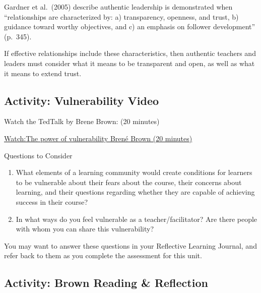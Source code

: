 \documentclass[
]{book}
\providecommand{\tightlist}{%
  \setlength{\itemsep}{0pt}\setlength{\parskip}{0pt}}
\begin{document}
Gardner et al.~(2005) describe authentic leadership is demonstrated when ``relationships are characterized by: a) transparency, openness, and trust, b) guidance toward worthy objectives, and c) an emphasis on follower development'' (p.~345).

If effective relationships include these characteristics, then authentic teachers and leaders must consider what it means to be transparent and open, as well as what it means to extend trust.

\hypertarget{activity-vulnerability-video}{%
\subsection*{Activity: Vulnerability Video}\label{activity-vulnerability-video}}

\begin{reflect}
Watch the TedTalk by Brene Brown: (20 minutes)

\href{https://www.youtube.com/watch?v=iCvmsMzlF7o}{Watch:The power of
vulnerability \textbar{} Brené Brown (20 minutes)}

{Questions to Consider}

\begin{enumerate}
\def\labelenumi{\arabic{enumi}.}
\tightlist
\item
  What elements of a learning community would create conditions for
  learners to be vulnerable about their fears about the course, their
  concerns about learning, and their questions regarding whether they
  are capable of achieving success in their course?\\
\item
  In what ways do you feel vulnerable as a teacher/facilitator? Are
  there people with whom you can share this vulnerability?
\end{enumerate}

You may want to answer these questions in your Reflective Learning
Journal, and refer back to them as you complete the assessment for this
unit.
\end{reflect}

\hypertarget{activity-brown-reading-reflection}{%
\subsection*{Activity: Brown Reading \& Reflection}\label{activity-brown-reading-reflection}}
\end{document}
